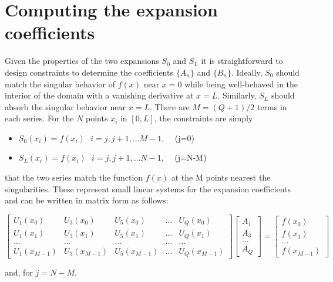 \documentclass{jfm-like}
\begin{document}
\section{Computing the expansion coefficients}
Given the properties of the two expansions $S_0$ and $S_L$ it is straightforward to design constraints to determine the coefficients $\{A_n\}$ and $\{B_n\}$. Ideally, $S_0$ should match the singular behavior of
$f(x)$ near $x=0$ while being well-behaved in the interior of the domain with a vanishing derivative at $x=L$. Similarly, $S_L$ should absorb the singular behavior near $x=L$. There are $M = (Q+1)/2$ terms in each series.
For the $N$  points $x_i$ in $[0,L]$, the constraints are simply
\vspace{12pt}
\begin{itemize}
\item $S_0(x_i) = f(x_i) ~~~i=j,j+1, \dots M-1$, ~~(j=0)
\item $S_L(x_i) = f(x_i) ~~~i=j,j+1, \dots N-1$, ~~(j=N-M)
\end{itemize}
\vspace{12pt}

 that the two series match the function $f(x)$ at the M points nearest the singularities. These represent small linear systems for the expansion coefficients and
can be written in matrix form as follows:

\footnotesize
\begin{equation}
\begin{bmatrix}
U_1(x_0) & U_3(x_0) & U_5(x_0) & \dots & U_Q(x_0) \\
U_1(x_1) & U_3(x_1) & U_5(x_1) & \dots & U_Q(x_1) \\
\dots  & \dots  & \dots  & \dots & \dots  \\
U_1(x_{M-1}) & U_3(x_{M-1}) & U_5(x_{M-1}) & \dots & U_Q(x_{M-1})
\end{bmatrix}
\begin{bmatrix}
A_1 \\ A_3 \\ \dots \\ A_{Q} 
\end{bmatrix}
=
\begin{bmatrix}
f(x_0) \\ f(x_1) \\ \dots \\ f(x_{M-1})
\end{bmatrix}
\label{eq:mat1}
\end{equation}
\normalsize

\vspace{12pt}
and, for $j=N-M$,
\vspace{12pt}
\end{document}

